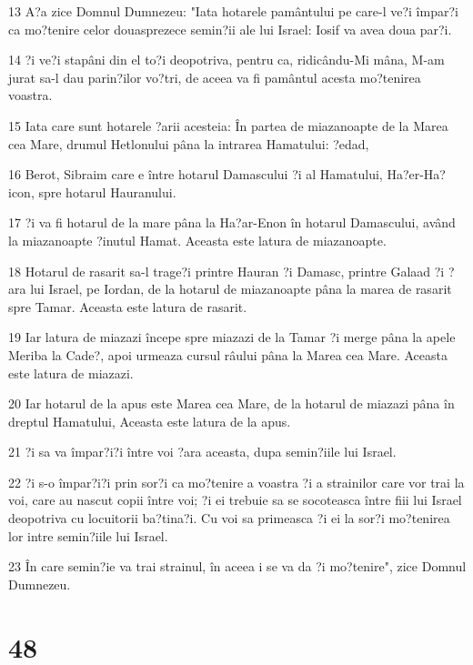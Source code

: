 \par 13 A?a zice Domnul Dumnezeu: "Iata hotarele pamântului pe care-l ve?i împar?i ca mo?tenire celor douasprezece semin?ii ale lui Israel: Iosif va avea doua par?i.
\par 14 ?i ve?i stapâni din el to?i deopotriva, pentru ca, ridicându-Mi mâna, M-am jurat sa-l dau parin?ilor vo?tri, de aceea va fi pamântul acesta mo?tenirea voastra.
\par 15 Iata care sunt hotarele ?arii acesteia: În partea de miazanoapte de la Marea cea Mare, drumul Hetlonului pâna la intrarea Hamatului: ?edad,
\par 16 Berot, Sibraim care e între hotarul Damascului ?i al Hamatului, Ha?er-Ha?icon, spre hotarul Hauranului.
\par 17 ?i va fi hotarul de la mare pâna la Ha?ar-Enon în hotarul Damascului, având la miazanoapte ?inutul Hamat. Aceasta este latura de miazanoapte.
\par 18 Hotarul de rasarit sa-l trage?i printre Hauran ?i Damasc, printre Galaad ?i ?ara lui Israel, pe Iordan, de la hotarul de miazanoapte pâna la marea de rasarit spre Tamar. Aceasta este latura de rasarit.
\par 19 Iar latura de miazazi începe spre miazazi de la Tamar ?i merge pâna la apele Meriba la Cade?, apoi urmeaza cursul râului pâna la Marea cea Mare. Aceasta este latura de miazazi.
\par 20 Iar hotarul de la apus este Marea cea Mare, de la hotarul de miazazi pâna în dreptul Hamatului, Aceasta este latura de la apus.
\par 21 ?i sa va împar?i?i între voi ?ara aceasta, dupa semin?iile lui Israel.
\par 22 ?i s-o împar?i?i prin sor?i ca mo?tenire a voastra ?i a strainilor care vor trai la voi, care au nascut copii între voi; ?i ei trebuie sa se socoteasca între fiii lui Israel deopotriva cu locuitorii ba?tina?i. Cu voi sa primeasca ?i ei la sor?i mo?tenirea lor intre semin?iile lui Israel.
\par 23 În care semin?ie va trai strainul, în aceea i se va da ?i mo?tenire", zice Domnul Dumnezeu.

\chapter{48}

